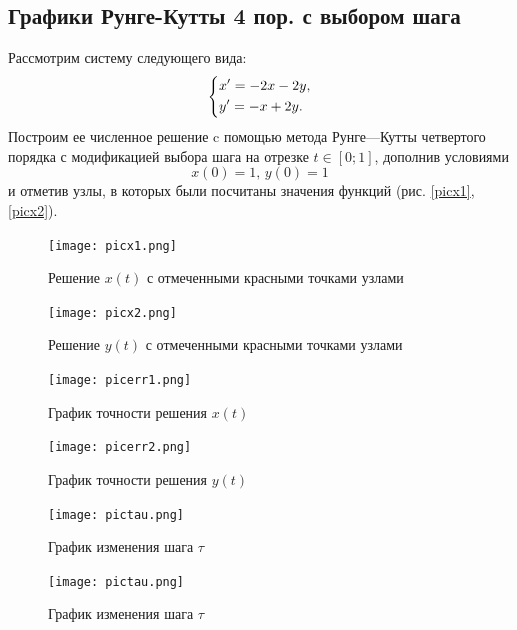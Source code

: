 \documentclass[12pt, a4paper]{article}
\begin{document}
	\subsection*{Графики Рунге-Кутты 4 пор. с выбором шага}
	Рассмотрим систему следующего вида:
	\[
		\begin{dcases}
			x' = -2x -2y,\\
			y' = -x + 2y.
		\end{dcases}
	\]
	Построим ее численное решение c помощью метода Рунге---Кутты четвертого порядка с модификацией выбора шага на отрезке $t \in \left[0; 1 \right]$, дополнив условиями 
	$$x(0) = 1, \, y(0) = 1$$
	и отметив узлы, в которых были посчитаны значения функций (рис. \ref{picx1}, \ref{picx2}).
	\begin{figure}[H]
		\begin{minipage}[b]{0.45\linewidth}
			\centering
			\texttt{[image: picx1.png]}
			\caption{Решение $x(t)$ с отмеченными красными точками узлами}
			\label{picx1}
		  \end{minipage}
		  \hfill
		  \begin{minipage}[b]{0.45\linewidth}
			\centering
			\texttt{[image: picx2.png]}
			\caption{Решение $y(t)$ с отмеченными красными точками узлами}
			\label{picx2}
		  \end{minipage}
		  \vfill
		  \vspace{1em}
		  \begin{minipage}[b]{0.45\linewidth}
			\centering
			\texttt{[image: picerr1.png]}
			\caption{График точности решения $x(t)$}
			\label{picerr1}
		  \end{minipage}
		  \hfill
		  \begin{minipage}[b]{0.45\linewidth}
			\centering
			\texttt{[image: picerr2.png]}
			\caption{График точности решения $y (t)$}
			\label{picerr2}
		  \end{minipage}
		  \vfill
		  \vspace{1em}
		  \begin{minipage}[b]{0.45\linewidth}
			\centering
			\texttt{[image: pictau.png]}
			\caption{График изменения шага $\tau$}
			\label{pictau}
		  \end{minipage}
		  \hfill
		  \begin{minipage}[b]{0.45\linewidth}
			\centering
			\texttt{[image: pictau.png]}
			\caption{График изменения шага $\tau$}
		  \end{minipage}
	\end{figure}
\end{document}
